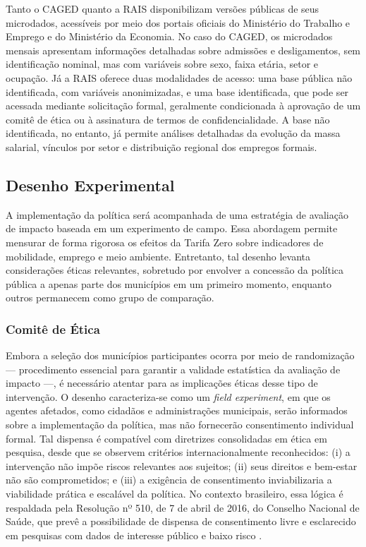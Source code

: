 Tanto o CAGED quanto a RAIS disponibilizam versões públicas de seus microdados, acessíveis por meio dos portais oficiais do Ministério do Trabalho e Emprego e do Ministério da Economia. No caso do CAGED, os microdados mensais apresentam informações detalhadas sobre admissões e desligamentos, sem identificação nominal, mas com variáveis sobre sexo, faixa etária, setor e ocupação. Já a RAIS oferece duas modalidades de acesso: uma base pública não identificada, com variáveis anonimizadas, e uma base identificada, que pode ser acessada mediante solicitação formal, geralmente condicionada à aprovação de um comitê de ética ou à assinatura de termos de confidencialidade. A base não identificada, no entanto, já permite análises detalhadas da evolução da massa salarial, vínculos por setor e distribuição regional dos empregos formais.

\subsection{Desenho Experimental}

A implementação da política será acompanhada de uma estratégia de avaliação de impacto baseada em um experimento de campo. Essa abordagem permite mensurar de forma rigorosa os efeitos da Tarifa Zero sobre indicadores de mobilidade, emprego e meio ambiente. Entretanto, tal desenho levanta considerações éticas relevantes, sobretudo por envolver a concessão da política pública a apenas parte dos municípios em um primeiro momento, enquanto outros permanecem como grupo de comparação.

\subsubsection{Comitê de Ética}

Embora a seleção dos municípios participantes ocorra por meio de randomização — procedimento essencial para garantir a validade estatística da avaliação de impacto —, é necessário atentar para as implicações éticas desse tipo de intervenção. O desenho caracteriza-se como um \textit{field experiment}, em que os agentes afetados, como cidadãos e administrações municipais, serão informados sobre a implementação da política, mas não fornecerão consentimento individual formal. Tal dispensa é compatível com diretrizes consolidadas em ética em pesquisa, desde que se observem critérios internacionalmente reconhecidos: (i) a intervenção não impõe riscos relevantes aos sujeitos; (ii) seus direitos e bem-estar não são comprometidos; e (iii) a exigência de consentimento inviabilizaria a viabilidade prática e escalável da política. No contexto brasileiro, essa lógica é respaldada pela Resolução nº 510, de 7 de abril de 2016, do Conselho Nacional de Saúde, que prevê a possibilidade de dispensa de consentimento livre e esclarecido em pesquisas com dados de interesse público e baixo risco \cite{CNS_2016}.

